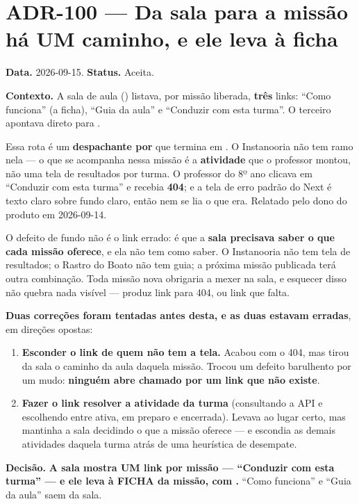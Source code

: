 \section{ADR-100 --- Da sala para a missão há UM caminho, e ele leva à ficha}
\label{adr:um-caminho-da-sala}

\textbf{Data.} 2026-09-15. \textbf{Status.} Aceita.

\textbf{Contexto.} A sala de aula () listava, por
missão liberada, \textbf{três} links: \enquote{Como funciona} (a ficha),
\enquote{Guia da aula} e \enquote{Conduzir com esta turma}. O terceiro apontava
direto para .

Essa rota é um \textbf{despachante por } que termina em
. O Instanooria não tem ramo nela --- o que se acompanha nessa
missão é a \textbf{atividade} que o professor montou, não uma tela de resultados
por turma. O professor do 8º ano clicava em \enquote{Conduzir com esta turma} e
recebia \textbf{404}; e a tela de erro padrão do Next é texto claro sobre fundo
claro, então nem se lia o que era. Relatado pelo dono do produto em 2026-09-14.

O defeito de fundo não é o link errado: é que a \textbf{sala precisava saber o
que cada missão oferece}, e ela não tem como saber. O Instanooria não tem tela
de resultados; o Rastro do Boato não tem guia; a próxima missão publicada terá
outra combinação. Toda missão nova obrigaria a mexer na sala, e esquecer disso
não quebra nada visível --- produz link para 404, ou link que falta.

\textbf{Duas correções foram tentadas antes desta, e as duas estavam erradas},
em direções opostas:

\begin{enumerate}
  \item \textbf{Esconder o link de quem não tem a tela.} Acabou com o 404, mas
    tirou da sala o caminho da aula daquela missão. Trocou um defeito barulhento
    por um mudo: \textbf{ninguém abre chamado por um link que não existe}.
  \item \textbf{Fazer o link resolver a atividade da turma} (consultando a API e
    escolhendo entre ativa, em preparo e encerrada). Levava ao lugar certo, mas
    mantinha a sala decidindo o que a missão oferece --- e escondia as demais
    atividades daquela turma atrás de uma heurística de desempate.
\end{enumerate}

\textbf{Decisão.} \textbf{A sala mostra UM link por missão ---
\enquote{Conduzir com esta turma} --- e ele leva à FICHA da missão, com
.} \enquote{Como funciona} e \enquote{Guia da aula} saem da sala.

